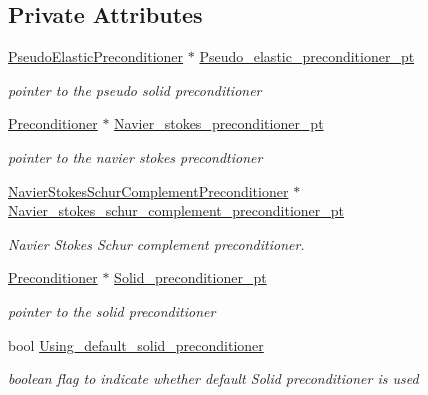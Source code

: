 \subsection*{Private Attributes}
\begin{DoxyCompactItemize}
\item 
\hyperlink{classoomph_1_1PseudoElasticPreconditioner}{Pseudo\+Elastic\+Preconditioner} $\ast$ \hyperlink{classoomph_1_1PseudoElasticFSIPreconditioner_afad4b204e6b7b2a63e4c4e0fe2f9f2c0}{Pseudo\+\_\+elastic\+\_\+preconditioner\+\_\+pt}
\begin{DoxyCompactList}\small\item\em pointer to the pseudo solid preconditioner \end{DoxyCompactList}\item 
\hyperlink{classoomph_1_1Preconditioner}{Preconditioner} $\ast$ \hyperlink{classoomph_1_1PseudoElasticFSIPreconditioner_a5314b4734298c3de8f394a45792ba1c9}{Navier\+\_\+stokes\+\_\+preconditioner\+\_\+pt}
\begin{DoxyCompactList}\small\item\em pointer to the navier stokes precondtioner \end{DoxyCompactList}\item 
\hyperlink{classoomph_1_1NavierStokesSchurComplementPreconditioner}{Navier\+Stokes\+Schur\+Complement\+Preconditioner} $\ast$ \hyperlink{classoomph_1_1PseudoElasticFSIPreconditioner_a438b2a5932c1fde633a73107043f0b09}{Navier\+\_\+stokes\+\_\+schur\+\_\+complement\+\_\+preconditioner\+\_\+pt}
\begin{DoxyCompactList}\small\item\em Navier Stokes Schur complement preconditioner. \end{DoxyCompactList}\item 
\hyperlink{classoomph_1_1Preconditioner}{Preconditioner} $\ast$ \hyperlink{classoomph_1_1PseudoElasticFSIPreconditioner_a2d96e724939038637ff4911372ee69b4}{Solid\+\_\+preconditioner\+\_\+pt}
\begin{DoxyCompactList}\small\item\em pointer to the solid preconditioner \end{DoxyCompactList}\item 
bool \hyperlink{classoomph_1_1PseudoElasticFSIPreconditioner_aab116f252418ca092f7e6f0f75de6778}{Using\+\_\+default\+\_\+solid\+\_\+preconditioner}
\begin{DoxyCompactList}\small\item\em boolean flag to indicate whether default Solid preconditioner is used \end{DoxyCompactList}\item 

\end{DoxyCompactItemize}
